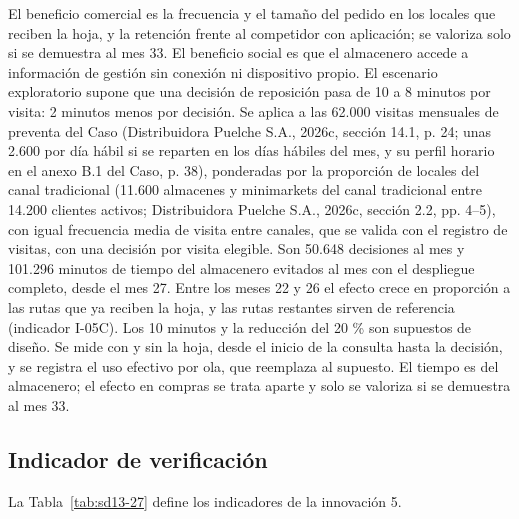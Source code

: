 El beneficio comercial es la frecuencia y el tamaño del pedido en los locales que reciben la hoja, y la retención frente al competidor con aplicación; se valoriza solo si se demuestra al mes 33. El beneficio social es que el almacenero accede a información de gestión sin conexión ni dispositivo propio. El escenario exploratorio supone que una decisión de reposición pasa de 10 a 8 minutos por visita: 2 minutos menos por decisión. Se aplica a las 62.000 visitas mensuales de preventa del Caso (Distribuidora Puelche S.A., 2026c, sección 14.1, p. 24; unas 2.600 por día hábil si se reparten en los días hábiles del mes, y su perfil horario en el anexo B.1 del Caso, p. 38), ponderadas por la proporción de locales del canal tradicional (11.600 almacenes y minimarkets del canal tradicional entre 14.200 clientes activos; Distribuidora Puelche S.A., 2026c, sección 2.2, pp. 4--5), con igual frecuencia media de visita entre canales, que se valida con el registro de visitas, con una decisión por visita elegible. Son 50.648 decisiones al mes y 101.296 minutos de tiempo del almacenero evitados al mes con el despliegue completo, desde el mes 27. Entre los meses 22 y 26 el efecto crece en proporción a las rutas que ya reciben la hoja, y las rutas restantes sirven de referencia (indicador I-05C). Los 10 minutos y la reducción del 20 \% son supuestos de diseño. Se mide con y sin la hoja, desde el inicio de la consulta hasta la decisión, y se registra el uso efectivo por ola, que reemplaza al supuesto. El tiempo es del almacenero; el efecto en compras se trata aparte y solo se valoriza si se demuestra al mes 33.

\subsection{Indicador de verificación}

La Tabla~\ref{tab:sd13-27} define los indicadores de la innovación 5.

